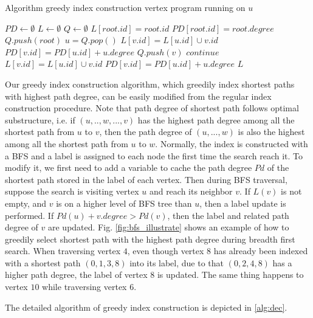 \begin{algorithm}
    \caption{Algorithm greedy index construction vertex program running on $u$}
		\label{alg:ind}
    \begin{algorithmic}
					\State $PD \gets \emptyset$
					\State $L \gets \emptyset$
					\State $Q \gets \emptyset$
					\State $L[root.id] = root.id$
					\State $PD[root.id] = root.degree$
					\State $Q.push(root)$
						\State $u = Q.pop()$
								\State $L[v.id] = L[u.id] \cup v.id$
								\State $PD[v.id] = PD[u.id] + u.degree$
								\State $Q.push(v)$
							\ElsIf{$L(v).size() < L(u).size() + 1$}
								\State $continue$
							\ElsIf{PD[v.id] < PD[u.id] + u.degree}
								\State $L[v.id] = L[u.id] \cup v.id$
								\State $PD[v.id] = PD[u.id] + u.degree$
							\EndIf
						\EndFor
					\EndWhile
					\State \Return $L$
        \EndFunction
    \end{algorithmic}
\end{algorithm}

Our greedy index construction algorithm, which greedily index shortest paths with highest path degree, can be easily modified from the regular index construction procedure. Note that path degree of shortest path follows optimal substructure, i.e. if $(u, .., w, ..., v)$ has the highest path degree among all the shortest path from $u$ to $v$, then the path degree of $(u, ..., w)$ is also the highest among all the shortest path from $u$ to $w$. Normally, the index is constructed with a BFS and a label is assigned to each node the first time the search reach it. To modify it, we first need to add a variable to cache the path degree $Pd$ of the shortest path stored in the label of each vertex. Then during BFS traversal, suppose the search is visiting vertex $u$ and reach its neighbor $v$. If $L(v)$ is not empty, and $v$ is on a higher level of BFS tree than $u$, then a label update is performed. If $Pd(u) + v.degree > Pd(v)$, then the label and related path degree of $v$ are updated. Fig. \ref{fig:bfs_illustrate} shows an example of how to greedily select shortest path with the highest path degree during breadth first search. When traversing vertex $4$, even though vertex $8$ has already been indexed with a shortest path $(0, 1, 3, 8)$ into its label, due to that $(0, 2, 4, 8)$ has a higher path degree, the label of vertex $8$ is updated. The same thing happens to vertex $10$ while traversing vertex $6$.

The detailed algorithm of greedy index construction is depicted in \ref{alg:dec}.